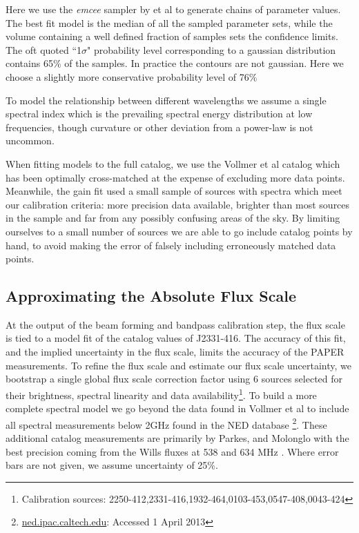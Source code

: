 \documentclass[preprint]{aastex}
\begin{document}
Here we use the \emph{emcee} sampler by \citet{Mackay:2003p9717} et al to generate chains of
parameter values. The best fit model is the median of all the sampled
parameter sets, while the volume containing a well defined fraction of samples
sets the confidence limits.  The oft quoted ``1$\sigma$" probability level
corresponding to a gaussian distribution contains 65\% of the samples. In
practice the contours are not gaussian. Here we choose a slightly more
conservative probability level of 76\% 


To model the relationship between different wavelengths we assume a single spectral index
which is the prevailing spectral energy distribution at low frequencies, 
though curvature or other
deviation from a power-law is not uncommon.  

When fitting models to the full catalog, we use the Vollmer et al
catalog which has been optimally cross-matched at the expense of excluding more data points.
Meanwhile, the gain fit used a small sample of
sources with spectra which meet our calibration criteria: more precision data available,
brighter than most sources in the sample and far from any possibly confusing areas of
the sky. 
By limiting ourselves to a small number of sources we are able to go include catalog points by hand,
to avoid making the error of falsely including erroneously matched 
data points.


\subsection{Approximating the Absolute Flux Scale}
\label{sec:flux_scale}

At the output of the beam forming and bandpass calibration step, the flux scale
 is tied to a model fit of the catalog values of
J2331-416. The accuracy of this fit, and the implied uncertainty in the flux
scale, limits the accuracy of the PAPER measurements.  To refine the flux
scale and estimate our flux scale uncertainty, we bootstrap a single global flux scale 
correction factor using 6
sources selected for their brightness, spectral linearity and data
availability\footnote{Calibration sources:
2250-412,2331-416,1932-464,0103-453,0547-408,0043-424}. To build a more complete
spectral model we go beyond the data found in Vollmer et al to include all spectral
measurements below 2GHz found in the NED database \footnote{\url{ned.ipac.caltech.edu}: Accessed 1 April 2013}.  These additional
 catalog measurements are primarily by Parkes, and Molonglo  \citep{Kuehr:1981p9323} with the best precision coming from the
Wills fluxes at 538 and 634 MHz \citep{Wills:1975p9314}. Where error bars are not
given, we assume uncertainty of 25\%. 
\end{document}
